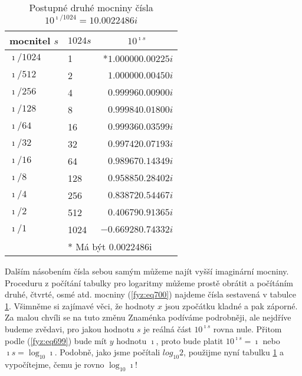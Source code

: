    \begin{table}[ht!]
      \centering
      \renewcommand{\arraystretch}{1.2}
      \begin{tabular}{@{}l|lr@{}}
        \toprule
        mocnitel \(s\)   & \(\num{1024} s\)  & \multicolumn{1}{c}{\(10^{\imath s}\)}  \\ \hline
        \(\imath/1024\) & \num{1   }        &  *\(\num{+1.00000+0.00225i}\)               \\
        \(\imath/512 \) & \num{2   }        &   \(\num{+1.00000+0.00450i}\)               \\
        \(\imath/256 \) & \num{4   }        &   \(\num{+0.99996+0.00900i}\)               \\
        \(\imath/128 \) & \num{8   }        &   \(\num{+0.99984+0.01800i}\)               \\
        \(\imath/64  \) & \num{16  }        &   \(\num{+0.99936+0.03599i}\)               \\
        \(\imath/32  \) & \num{32  }        &   \(\num{+0.99742+0.07193i}\)               \\
        \(\imath/16  \) & \num{64  }        &   \(\num{+0.98967+0.14349i}\)               \\
        \(\imath/8   \) & \num{128 }        &   \(\num{+0.95885+0.28402i}\)               \\
        \(\imath/4   \) & \num{256 }        &   \(\num{+0.83872+0.54467i}\)               \\
        \(\imath/2   \) & \num{512 }        &   \(\num{+0.40679+0.91365i}\)               \\
        \(\imath/1   \) & \num{1024}        &   \(\num{-0.66928+0.74332i}\)               \\ 
                        & \multicolumn{2}{l}{* Má být \num{0.0022486i}}               \\\bottomrule
      \end{tabular}
      \caption{Postupné druhé mocniny čísla \(10^{\imath/1024}=\num{1+0.0022486i}\)}
      \label{fyz:tab012}
    \end{table}

    Dalším násobením čísla sebou samým můžeme najít vyšší imaginární mocniny. Proceduru z počítání
    tabulky pro logaritmy můžeme prostě obrátit a počítáním druhé, čtvrté, osmé atd. mocniny
    (\ref{fyz:eq700}) najdeme čísla sestavená v tabulce \ref{fyz:tab012}. Všimněme si zajímavé věci,
    že hodnoty \(x\) jsou zpočátku kladné a pak záporné. Za malou chvíli se na tuto změnu Znaménka
    podíváme podrobněji, ale nejdříve budeme zvědavi, pro jakou hodnotu \(s\) je reálná část
    \(10^{\imath s}\) rovna nule. Přitom podle (\ref{fyz:eq699}) bude mít \(y\) hodnotu \(\imath\),
    proto bude platit \(10^{\imath s} =\imath\) nebo \(\imath s=\log_{10}\imath\). Podobně, jako
    jsme počítali \(log_{10}2\), použijme nyní tabulku \ref{fyz:tab012} a vypočítejme, čemu je rovno
    \(\log_{10}\imath\)!

